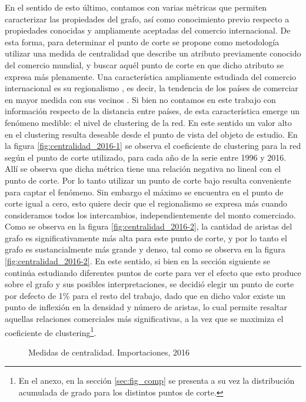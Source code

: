 \documentclass[class=article, crop=false]{standalone}
\begin{document}
En el sentido de esto último, contamos con varias métricas que permiten caracterizar las propiedades del grafo, así como conocimiento previo respecto a propiedades conocidas y ampliamente aceptadas del comercio internacional. De esta forma, para determinar el punto de corte se propone como metodología utilizar una medida de centralidad que describe un atributo previamente conocido del comercio mundial, y buscar aquél punto de corte en que dicho atributo se expresa más plenamente. Una característica ampliamente estudiada del comercio internacional es su regionalismo \citep{das2004regionalism}, es decir, la tendencia de los países de comerciar en mayor medida con sus vecinos \citep{Head2014}. Si bien no contamos en este trabajo con información respecto de la distancia entre países, de esta característica emerge un fenómeno medible: el nivel de clustering de la red. En este sentido un valor alto en el clustering resulta deseable desde el punto de vista del objeto de estudio. En la figura \ref{fig:centralidad_2016-1} se observa el coeficiente de clustering para la red según el punto de corte utilizado, para cada año de la serie entre 1996 y 2016. Allí se observa que dicha métrica tiene una relación negativa no lineal con el punto de corte. Por lo tanto utilizar un punto de corte bajo resulta conveniente para captar el fenómeno. Sin embargo el máximo se encuentra en el punto de corte igual a cero, esto quiere decir que el regionalismo se expresa más cuando consideramos todos los intercambios, independientemente del monto comerciado. Como se observa en la figura \ref{fig:centralidad_2016-2}, la cantidad de aristas del grafo es significativamente más alta para este punto de corte, y por lo tanto el grafo es sustancialmente más grande y denso, tal como se observa en la figura \ref{fig:centralidad_2016-2}. En este sentido, si bien en la sección siguiente se continúa estudiando diferentes puntos de corte para ver el efecto que esto produce sobre el grafo y sus posibles interpretaciones, se decidió elegir un punto de corte por defecto de 1\% para el resto del trabajo, dado que en dicho valor existe un punto de inflexión en la densidad y número de aristas, lo cual permite resaltar aquellas relaciones comerciales más significativas, a la vez que se maximiza el coeficiente de clustering\footnote{En el anexo, en la sección \ref{sec:fig_comp} se presenta a su vez la distribución acumulada de grado para los distintos puntos de corte.}.

\begin{figure}
\centering
{}

\caption{Medidas de centralidad. Importaciones, 2016}
\label{fig:centralidad_2016}
\end{figure}
\end{document}
